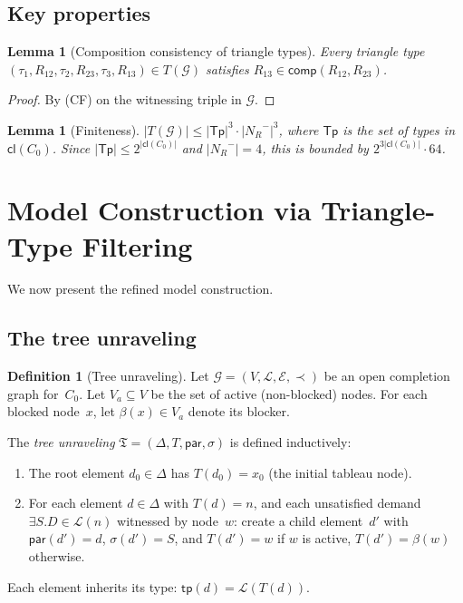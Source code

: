 \documentclass[a4paper,11pt]{article}
\newtheorem{lemma}[theorem]{Lemma}
\theoremstyle{definition}
\newtheorem{definition}[theorem]{Definition}
\newcommand{\NR}{\ensuremath{N_R}}
\newcommand{\comp}{\ensuremath{\mathsf{comp}}}
\newcommand{\cl}{\ensuremath{\mathsf{cl}}}
\newcommand{\Tp}{\ensuremath{\mathsf{Tp}}}
\begin{document}
\subsection{Key properties}

\begin{lemma}[Composition consistency of triangle types]
\label{lem:triangle-comp}
Every triangle type $(\tau_1, R_{12}, \tau_2, R_{23}, \tau_3, R_{13})
\in T(\mathcal{G})$ satisfies
$R_{13} \in \comp(R_{12}, R_{23})$.
\end{lemma}

\begin{proof}
By (CF) on the witnessing triple in $\mathcal{G}$.
\end{proof}

\begin{lemma}[Finiteness]
\label{lem:finiteness}
$|T(\mathcal{G})| \leq |\Tp|^3 \cdot |\NR^{-}|^3$, where $\Tp$ is
the set of types in $\cl(C_0)$.  Since $|\Tp| \leq 2^{|\cl(C_0)|}$
and $|\NR^{-}| = 4$, this is bounded by $2^{3|\cl(C_0)|} \cdot 64$.
\end{lemma}


\section{Model Construction via Triangle-Type Filtering}
\label{sec:model-construction}

We now present the refined model construction.

\subsection{The tree unraveling}

\begin{definition}[Tree unraveling]
\label{def:unraveling}
Let $\mathcal{G} = (V, \mathcal{L}, \mathcal{E}, \prec)$ be an open
completion graph for~$C_0$.  Let $V_a \subseteq V$ be the set of
active (non-blocked) nodes.  For each blocked node~$x$, let
$\beta(x) \in V_a$ denote its blocker.

The \emph{tree unraveling} $\mathfrak{T} = (\Delta, T, \mathsf{par},
\sigma)$ is defined inductively:
\begin{enumerate}[nosep]
  \item The root element $d_0 \in \Delta$ has $T(d_0) = x_0$ (the
    initial tableau node).
  \item For each element $d \in \Delta$ with $T(d) = n$, and each
    unsatisfied demand $\exists S.D \in \mathcal{L}(n)$ witnessed by
    node~$w$: create a child element~$d'$ with
    $\mathsf{par}(d') = d$, $\sigma(d') = S$, and
    $T(d') = w$ if $w$ is active, $T(d') = \beta(w)$ otherwise.
\end{enumerate}
Each element inherits its type: $\mathsf{tp}(d) = \mathcal{L}(T(d))$.
\end{definition}
\end{document}
